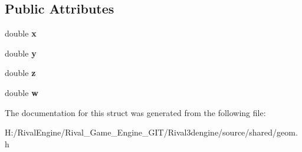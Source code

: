 \subsection*{Public Attributes}
\begin{DoxyCompactItemize}
\item 
\mbox{\label{structdvec4_a0d2c075b123e2587e410e4ac4b511a23}} 
double {\bfseries x}
\item 
\mbox{\label{structdvec4_a10063e2168d21e7a804f40932c20fd8a}} 
double {\bfseries y}
\item 
\mbox{\label{structdvec4_af77e57dbb58d77caba28073219bc51b5}} 
double {\bfseries z}
\item 
\mbox{\label{structdvec4_a0be559e5c0875fc3a3372a55d2f98ef2}} 
double {\bfseries w}
\end{DoxyCompactItemize}


The documentation for this struct was generated from the following file\+:\begin{DoxyCompactItemize}
\item 
H\+:/\+Rival\+Engine/\+Rival\+\_\+\+Game\+\_\+\+Engine\+\_\+\+G\+I\+T/\+Rival3dengine/source/shared/geom.\+h\end{DoxyCompactItemize}
